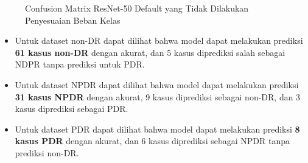 \begin{figure}[hbtp]
	\centering
	\qquad
	\qquad
	\caption{Confusion Matrix ResNet-50 Default yang Tidak Dilakukan Penyesuaian Beban Kelas}
	\label{fig:confRes50}
\end{figure}

\begin{itemize}
	\item Untuk dataset non-DR dapat dilihat bahwa model dapat melakukan prediksi \textbf{61 kasus non-DR} dengan akurat, dan 5 kasus diprediksi salah sebagai NDPR tanpa prediksi untuk PDR.
	
	\item Untuk dataset NPDR dapat dilihat bahwa model dapat melakukan prediksi \textbf{31 kasus NPDR} dengan akurat, 9 kasus diprediksi sebagai non-DR, dan 3 kasus diprediksi sebagai PDR.
	
	\item Untuk dataset PDR dapat dilihat bahwa model dapat melakukan prediksi \textbf{8 kasus PDR} dengan akurat, dan 6 kasus diprediksi sebagai NPDR tanpa prediksi non-DR.
\end{itemize}
\pagebreak

